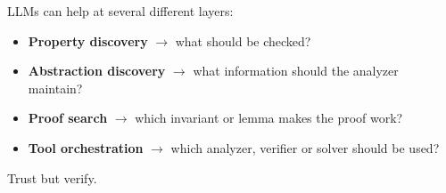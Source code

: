 \documentclass[11pt]{book}
\begin{document}
LLMs can help at several different layers:

\begin{itemize}
    \item \textbf{Property discovery}
    $\rightarrow$ what should be checked?

    \item \textbf{Abstraction discovery}
    $\rightarrow$ what information should the analyzer maintain?

    \item \textbf{Proof search}
    $\rightarrow$ which invariant or lemma makes the proof work?

    \item \textbf{Tool orchestration}
    $\rightarrow$ which analyzer, verifier or solver should be used?
\end{itemize}

\begin{ppkey}
Trust but verify.
\end{ppkey}
\end{document}
